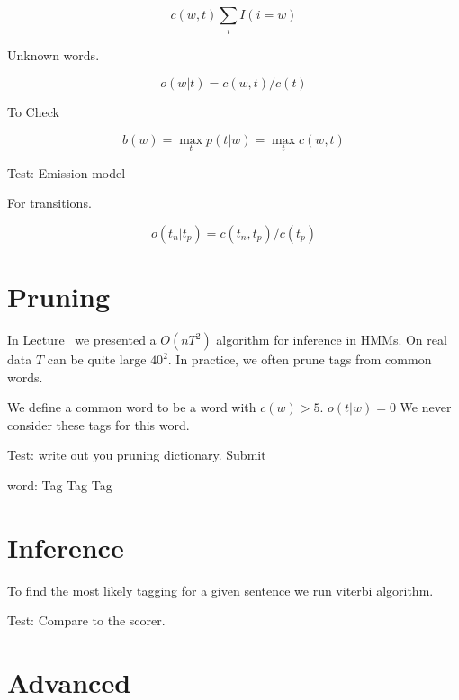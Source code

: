 \documentclass{article}
\begin{document}
\[ c(w, t) \sum_i I(i = w ) \] 

Unknown words. 


\[ o(w | t) = c(w , t) / c(t)  \]

To Check 

\[ b(w) = \max_{t} p(t | w) = \max_t c(w,  t) \] 

Test: Emission model 

For transitions.

\[ o(t_n | t_p ) = c(t_n , t_p) / c(t_p)  \]

\section{Pruning}

In Lecture~ we presented a $O(nT^2)$ algorithm for inference in HMMs. On real data $T$ can be quite large $40^2$. In practice, we often prune tags from common words. 

We define a common word to be a word with $c(w) > 5$. $o(t | w) = 0$ We never consider these tags for this word.

Test: write out you pruning dictionary. Submit

word: Tag Tag Tag

\section{Inference}

To find the most likely tagging for a given sentence we run viterbi algorithm. 

\begin{algorithm}
  
\end{algorithm}

Test: Compare to the scorer.

\section{Advanced}
\end{document}
